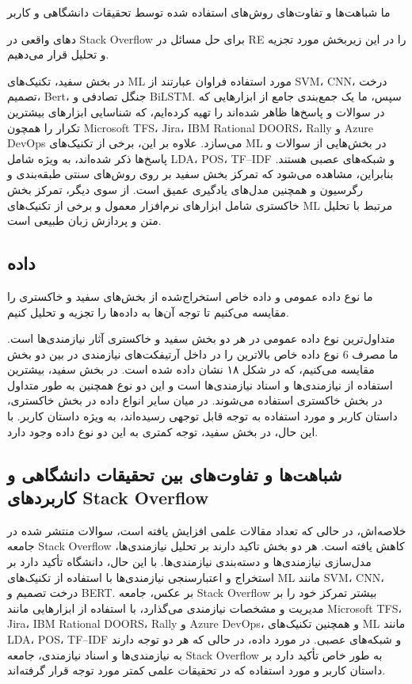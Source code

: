 \documentclass[a4paper,10pt]{article}
\begin{document}
                ما شباهت‌ها و تفاوت‌های روش‌های استفاده شده توسط تحقیقات دانشگاهی و کاربر

                دهای واقعی در Stack Overflow برای حل مسائل در RE را در این زیربخش مورد تجزیه و تحلیل قرار می‌دهیم.

                در بخش سفید، تکنیک‌های ML مورد استفاده فراوان عبارتند از SVM، CNN، درخت تصمیم، Bert، جنگل تصادفی و BiLSTM. سپس، ما یک جمع‌بندی جامع از ابزارهایی که در سوالات و پاسخ‌ها ظاهر شده‌اند را تهیه کرده‌ایم، که شناسایی ابزارهای بیشترین تکرار را همچون Microsoft TFS، Jira، IBM Rational DOORS، Rally و Azure DevOps می‌سازد. علاوه بر این، برخی از تکنیک‌های ML در بخش‌هایی از سوالات و پاسخ‌ها ذکر شده‌اند، به ویژه شامل LDA، POS، TF–IDF و شبکه‌های عصبی هستند. بنابراین، مشاهده می‌شود که تمرکز بخش سفید بر روی روش‌های سنتی طبقه‌بندی و رگرسیون و همچنین مدل‌های یادگیری عمیق است. از سوی دیگر، تمرکز بخش خاکستری شامل ابزارهای نرم‌افزار معمول و برخی از تکنیک‌های ML مرتبط با تحلیل متن و پردازش زبان طبیعی است.

        \subsection{داده}

            ما نوع داده عمومی و داده خاص استخراج‌شده از بخش‌های سفید و خاکستری را مقایسه می‌کنیم تا توجه آن‌ها به داده‌ها را تجزیه و تحلیل کنیم.

            متداول‌ترین نوع داده عمومی در هر دو بخش سفید و خاکستری آثار نیازمندی‌ها است. ما مصرف 6 نوع داده خاص بالاترین را در داخل آرتیفکت‌های نیازمندی در بین دو بخش مقایسه می‌کنیم، که در شکل ۱۸ نشان داده شده است. در بخش سفید، بیشترین استفاده از نیازمندی‌ها و اسناد نیازمندی‌ها است و این دو نوع همچنین به طور متداول در بخش خاکستری استفاده می‌شوند. در میان سایر انواع داده در بخش خاکستری، داستان کاربر و مورد استفاده به توجه قابل توجهی رسیده‌اند، به ویژه داستان کاربر. با این حال، در بخش سفید، توجه کمتری به این دو نوع داده وجود دارد.

        \subsection{شباهت‌ها و تفاوت‌های بین تحقیقات دانشگاهی و کاربردهای Stack Overflow}

            خلاصه‌اش، در حالی که تعداد مقالات علمی افزایش یافته است، سوالات منتشر شده در جامعه Stack Overflow کاهش یافته است. هر دو بخش تاکید دارند بر تحلیل نیازمندی‌ها، مدل‌سازی نیازمندی‌ها و دسته‌بندی نیازمندی‌ها. با این حال، دانشگاه تأکید دارد بر استخراج و اعتبارسنجی نیازمندی‌ها با استفاده از تکنیک‌های ML مانند SVM، CNN، درخت تصمیم و BERT. بر عکس، جامعه Stack Overflow بیشتر تمرکز خود را بر مدیریت و مشخصات نیازمندی می‌گذارد، با استفاده از ابزارهایی مانند Microsoft TFS، Jira، IBM Rational DOORS، Rally و Azure DevOps، و همچنین تکنیک‌های ML مانند LDA، POS، TF–IDF و شبکه‌های عصبی. در مورد داده، در حالی که هر دو توجه دارند به نیازمندی‌ها و اسناد نیازمندی، جامعه Stack Overflow به طور خاص تأکید دارد بر داستان کاربر و مورد استفاده که در تحقیقات علمی کمتر مورد توجه قرار گرفته‌اند.
\end{document}
